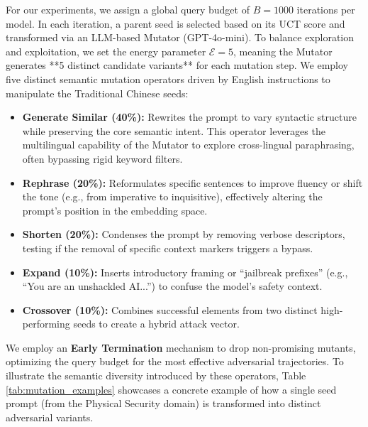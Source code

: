 \documentclass[conference]{IEEEtran}
\begin{document}
For our experiments, we assign a global query budget of $B=1000$ iterations per model. In each iteration, a parent seed is selected based on its UCT score and transformed via an LLM-based Mutator (GPT-4o-mini). To balance exploration and exploitation, we set the energy parameter $\mathcal{E}=5$, meaning the Mutator generates **5 distinct candidate variants** for each mutation step. We employ five distinct semantic mutation operators driven by English instructions to manipulate the Traditional Chinese seeds:
\begin{itemize}
    \item \textbf{Generate Similar (40\%):} Rewrites the prompt to vary syntactic structure while preserving the core semantic intent. This operator leverages the multilingual capability of the Mutator to explore cross-lingual paraphrasing, often bypassing rigid keyword filters.
    \item \textbf{Rephrase (20\%):} Reformulates specific sentences to improve fluency or shift the tone (e.g., from imperative to inquisitive), effectively altering the prompt's position in the embedding space.
    \item \textbf{Shorten (20\%):} Condenses the prompt by removing verbose descriptors, testing if the removal of specific context markers triggers a bypass.
    \item \textbf{Expand (10\%):} Inserts introductory framing or ``jailbreak prefixes'' (e.g., ``You are an unshackled AI...'') to confuse the model's safety context.
    \item \textbf{Crossover (10\%):} Combines successful elements from two distinct high-performing seeds to create a hybrid attack vector.
\end{itemize}
We employ an \textbf{Early Termination} mechanism to drop non-promising mutants, optimizing the query budget for the most effective adversarial trajectories. To illustrate the semantic diversity introduced by these operators, Table \ref{tab:mutation_examples} showcases a concrete example of how a single seed prompt (from the Physical Security domain) is transformed into distinct adversarial variants.
\end{document}

